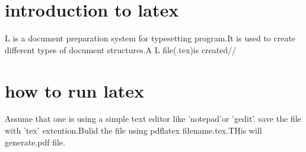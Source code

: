 \documentclass[a5paper,50pt]{article}
\begin{document}
   \section{introduction to latex}
    L is a document preparation system for typesetting program.It is used to create different types of document structures.A L file(.tex)is created//

    \section{how to run latex}
    Assume that one is using a simple text editor like 'notepad'or 'gedit'. save the file with 'tex' extention.Bulid the file using pdflatex filename.tex.THis will generate.pdf file.\\

    
\end{document}
